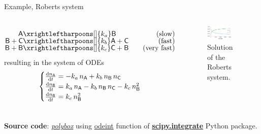 \begin{frame}{Example, Roberts system}
		\begin{columns}[t]
			   \footnotesize
				\begin{alignat*}{3}
					\mathsf{A} & \xrightleftharpoons[]{k_a} \mathsf{B} & \text{(slow)}\\[-5pt]
					\mathsf{B + C} & \xrightleftharpoons[]{k_b} \mathsf{A + C} & \text{(fast)}\\[-5pt]
					\mathsf{B + B} &\xrightleftharpoons[]{k_c} \mathsf{C + B} & \quad \text{(very fast)}
				\end{alignat*}
				\qquad resulting in the system of ODEs
				$$
				\quad 
				\begin{cases}
					\tfrac{{\rm d} n_\mathsf{A}}{{\rm d} t} = - k_a\, n_\mathsf{A} + k_b\, n_\mathsf{B}\, n_\mathsf{C}\\
					\tfrac{{\rm d} n_\mathsf{B}}{{\rm d} t} =   k_a\, n_\mathsf{A}-k_b\, n_\mathsf{B}\, n_\mathsf{C}-k_c\, n_\mathsf{B}^{2}\\
					\tfrac{{\rm d} n_\mathsf{B}}{{\rm d} t} =   k_c\, n_\mathsf{B}^{2}
				\end{cases}
				$$
			\vskip -5pt
			\begin{figure}[!h]
				\includegraphics[width=0.75\textwidth]{figures/chemical-kinetics/approximations}
				\caption{\scriptsize Solution of the Roberts system.}
			\end{figure}
		\end{columns}
		\vskip 5pt
		\textbf{Source code}: \href{https://polybox.ethz.ch/index.php/s/vZ54CLT6rooxoJ8}{\textcolor{indigo(dye)}{\it polybox}} using \href{https://docs.scipy.org/doc/scipy/reference/generated/scipy.integrate.odeint.html}{\textcolor{indigo(dye)}{odeint}} function of 
		\href{https://docs.scipy.org/doc/scipy/reference/integrate.html}{\textcolor{indigo(dye)}{\bf scipy.integrate}} Python package.
\end{frame}
%
